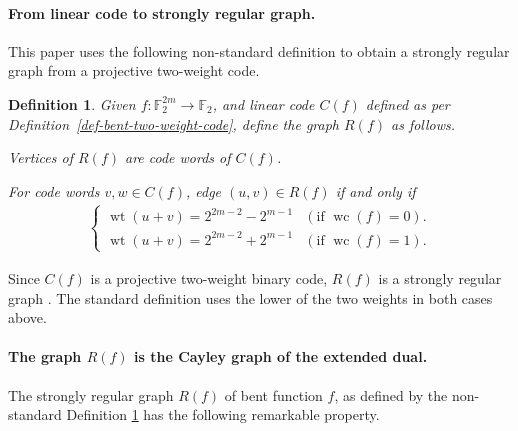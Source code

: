 \documentclass[12pt,a4paper]{article}
\newcommand{\mb}[1]{\mathbb{#1}}
\newcommand{\F}{\mb{F}}
\newcommand{\To}{\rightarrow}
\newcommand{\weight}[1]{\operatorname{wt}\left(#1\right)}
\newcommand{\weightclass}[1]{\operatorname{wc}\left(#1\right)}
\newtheorem{Definition}{Definition}
\begin{document}
\paragraph*{From linear code to strongly regular graph.}
This paper uses the following non-standard definition to obtain a strongly regular graph from a
projective two-weight code.
\begin{Definition}
\label{R-f-def}
Given $f : \F_2^{2m} \To \F_2$, and linear code $C(f)$ defined as per Definition~\ref{def-bent-two-weight-code},
define the graph $R(f)$ as follows.

Vertices of $R(f)$ are code words of $C(f)$.

For code words $v,w \in C(f)$, edge $(u,v) \in R(f)$ if and only if
\begin{align*}
\begin{cases}
\weight{u+v} = 2^{2m-2} - 2^{m-1} & (\text{if~}\weightclass{f}=0).
\\
\weight{u+v} = 2^{2m-2} + 2^{m-1} & (\text{if~}\weightclass{f}=1).
\end{cases}
\end{align*}

\end{Definition}
Since $C(f)$ is a projective two-weight binary code,
$R(f)$ is a strongly regular graph \cite[Theorem 2]{Del72weights}.
The standard definition uses the lower of the two weights in both cases above.




\paragraph*{The graph $R(f)$ is the Cayley graph of the extended dual.}
The strongly regular graph $R(f)$ of bent function $f$, as defined by the non-standard Definition
\ref{R-f-def} has the following remarkable property.
\end{document}
